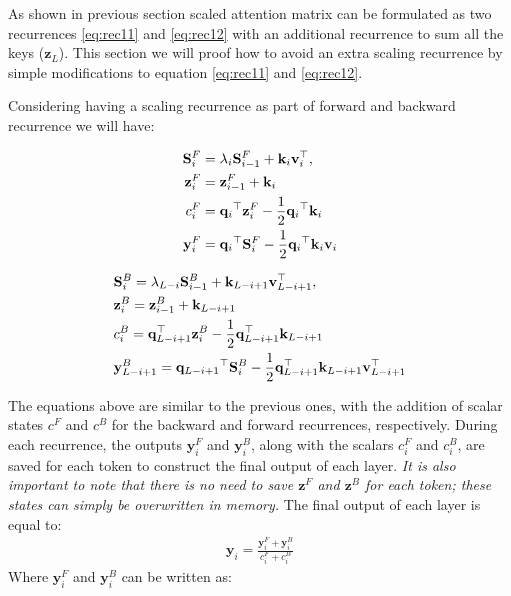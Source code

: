 As shown in previous section scaled attention matrix can be formulated as two recurrences \eqref{eq:rec11} and \eqref{eq:rec12} with an additional recurrence to sum all the keys ($\mathbf{z}_L$). This section we will proof how to avoid an extra scaling recurrence by simple modifications to equation \eqref{eq:rec11} and \eqref{eq:rec12}.

Considering having a scaling recurrence as part of forward and backward recurrence we will have:

\begin{minipage}[t]{.35\textwidth}
\begin{subequations}
\begin{align}
    \mathbf{S}^{F}_i &= \textcolor{black}{{\lambda}_i} \mathbf{S}^F_{i-1} + \mathbf{k}_i \mathbf{v}_i^{\top}, \\
    \mathbf{z}^F_i & =  \mathbf{z}^F_{i-1} +  \mathbf{k}_i \\
    c^F_i & =  {{\mathbf{q}_i}}^{\top} \mathbf{z}^F_{i} - \frac{1}{2}{{\mathbf{q}_i}}^{\top} \mathbf{k}_i \\
    \mathbf{y}^{F}_i &= {{{\mathbf{q}_i}}^{\top} \mathbf{S}^F_i}  - \frac{1}{2}{{\mathbf{q}_i}}^{\top} \mathbf{k}_i \mathbf{v}_i
\end{align}
\end{subequations}
\end{minipage}
\begin{minipage}[t]{.64\textwidth}
\begin{subequations}
    \begin{align}
    &\mathbf{S}^{B}_i= \textcolor{black}{{\lambda}_{L-i}} \mathbf{S}^B_{i-1} + \mathbf{k}_{L-i+1} \mathbf{v}_{L-i+1}^{\top}, \\
    & \mathbf{z}^B_i= \mathbf{z}^B_{i-1} +  \mathbf{k}_{L-i+1} \\
    & c^B_i = {\mathbf{q}_{L-i+1}^{\top}}\mathbf{z}^B_i -  \frac{1}{2}{\mathbf{q}_{L-i+1}^{\top}}\mathbf{k}_{L-i+1} \\
    &\mathbf{y}^{B}_{L-i+1} = {{{\mathbf{q}_{L-i+1}}}^{\top} \mathbf{S}^B_i} -  \frac{1}{2}{\mathbf{q}_{L-i+1}^{\top}}\mathbf{k}_{L-i+1}\mathbf{v}_{L-i+1}^{\top}
\end{align}
\end{subequations}
\end{minipage}

The equations above are similar to the previous ones, with the addition of scalar states \(c^F\) and \(c^B\) for the backward and forward recurrences, respectively. During each recurrence, the outputs \(\mathbf{y}^{F}_i\) and \(\mathbf{y}^{B}_i\), along with the scalars \(c^F_i\) and \(c^B_i\), are saved for each token to construct the final output of each layer. \textit{It is also important to note that there is no need to save \(\mathbf{z}^F\) and \(\mathbf{z}^B\) for each token; these states can simply be overwritten in memory.} The final output of each layer is equal to:
\begin{align}
    \mathbf{y}_i = \frac{\mathbf{y}^{F}_i + \mathbf{y}^{B}_i}{c^F_i + c^B_i }
\end{align}
Where $\mathbf{y}^{F}_i$ and  $\mathbf{y}^{B}_i$ can be written as:

